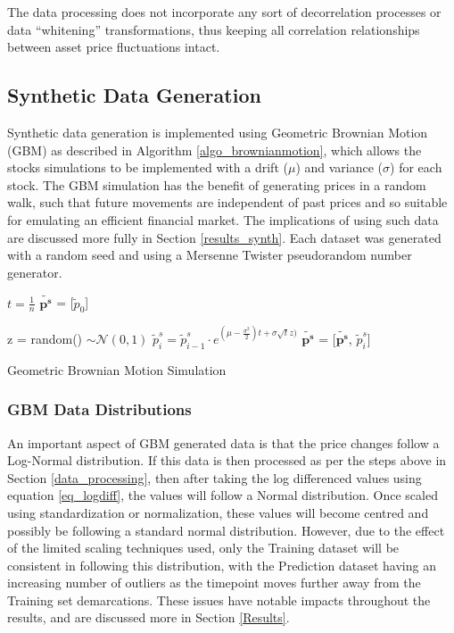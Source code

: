 \documentclass[a4paper,11pt,oneside]{article}
\theoremstyle{plain}
\theoremstyle{definition}
\begin{document}
	The data processing does not incorporate any sort of decorrelation processes or data ``whitening'' transformations, thus keeping all correlation relationships between asset price fluctuations intact.
	
	\subsection{Synthetic Data Generation}\label{data_synthetic}
	
	Synthetic data generation is implemented using Geometric Brownian Motion (GBM) as described in Algorithm \ref{algo_brownianmotion}, which allows the stocks simulations to be implemented with a drift ($\mu$) and variance ($\sigma$) for each stock. The GBM simulation has the benefit of generating prices in a random walk, such that future movements are independent of past prices and so suitable for emulating an efficient financial market. The implications of using such data are discussed more fully in Section \ref{results_synth}. Each dataset was generated with a random seed and using a Mersenne Twister pseudorandom number generator. \newline
	
	\begin{algorithm}[H]
		
		$t = \frac{1}{n}$\;
		$\mathbf{\tilde{p^s}}$ = [$\tilde{p}_0$]\;
		
		{
			z = random()  $\sim \mathcal{N}(0,1)$\;
			$\tilde{p}^s_i = \tilde{p}^s_{i-1} \cdot e^{(\mu - \frac {\sigma^2}{2})t + \sigma  \sqrt{t}  z)}$\;
			$\mathbf{\tilde{p^s}}$ = [$\mathbf{\tilde{p^s}}$, $\tilde{p}^s_i$]\;
		}
		\label{algo_brownianmotion}
		\caption{Geometric Brownian Motion Simulation}
	\end{algorithm}
	
	\subsubsection{GBM Data Distributions}
	
	An important aspect of GBM generated data is that the price changes follow a Log-Normal distribution. If this data is then processed as per the steps above in Section \ref{data_processing}, then after taking the log differenced values using equation \eqref{eq_logdiff}, the values will follow a Normal distribution. Once scaled using standardization or normalization, these values will become centred and possibly be following a standard normal distribution. However, due to the effect of the limited scaling techniques used, only the Training dataset will be consistent in following this distribution, with the Prediction dataset having an increasing number of outliers as the timepoint moves further away from the Training set demarcations. These issues have notable impacts throughout the results, and are discussed more in Section \ref{Results}.
	
\end{document}
